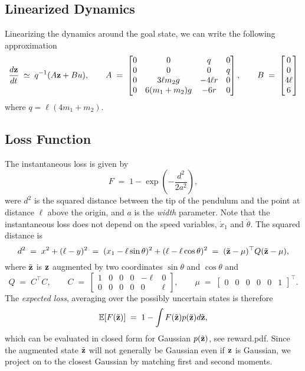\documentclass{article}
\newcommand{\bfz}{{\bf z}}
\newcommand{\E}{{\mathbb E}}
\begin{document}
\subsection*{Linearized Dynamics}

Linearizing the dynamics around the goal state, we can write the
following approximation
\[
\frac{d\bfz}{dt}\;\simeq\;q^{-1}(A\bfz+B u),\qquad
A\;=\;\begin{bmatrix}
0&0&q&0\\
0&0&0&q\\
0&3\ell m_2g&-4\ell r&0\\
0&6(m_1+m_2)g&-6r&0 \end{bmatrix},\qquad
B\;=\; \begin{bmatrix}
0\\ 0 \\ 4\ell \\ 6\end{bmatrix}
\]
where $q = \ell(4m_1+m_2)$.

\subsection*{Loss Function}

The instantaneous loss is given by
\[
F\;=\;1-\exp(-\frac{d^2}{2a^2}),
\]
were $d^2$ is the squared distance between the tip of the pendulum and
the point at distance $\ell$ above the origin, and $a$ is the
\emph{width} parameter. Note that the instantaneous loss does not
depend on the speed variables, $\dot x_1$ and $\dot\theta$. The
squared distance is
\[
d^2\;=\;x^2+(\ell-y)^2\;=\;(x_1-\ell\sin\theta)^2+(\ell-\ell\cos\theta)^2
\;=\;(\tilde\bfz-\mu)^\top Q(\tilde\bfz-\mu),
\]
where $\tilde\bfz$ is $\bfz$ augmented by two coordinates $\sin\theta$ and
$\cos\theta$ and
\[
Q\;=\;C^\top C,\qquad
C\;=\;\begin{bmatrix}1&0&0&0&-\ell&0\\ 0&0&0&0&0&\ell\end{bmatrix},\qquad
\mu\;=\;\begin{bmatrix}0&0&0&0&0&1\end{bmatrix}^\top.
\]
The \emph{expected loss}, averaging over the possibly uncertain states
is therefore
\[
\E[F(\tilde\bfz)]\;=\;1-\int F(\tilde\bfz)p(\tilde\bfz)d\tilde\bfz,
\]
which can be evaluated in closed form for Gaussian $p(\tilde\bfz)$, see
reward.pdf. Since the augmented state $\tilde\bfz$ will not generally
be Gaussian even if $\bfz$ is Gaussian, we project on to the closest
Gaussian by matching first and second moments.
\end{document}
